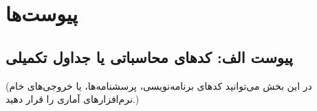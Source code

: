\chapter{پیوست‌ها}

\section{پیوست الف: کدهای محاسباتی یا جداول تکمیلی}
(در این بخش می‌توانید کدهای برنامه‌نویسی، پرسشنامه‌ها، یا خروجی‌های خام نرم‌افزارهای آماری را قرار دهید.)